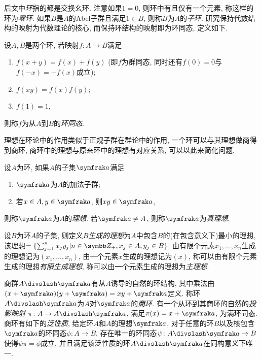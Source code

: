 后文中\emph{环}指的都是交换幺环. 注意如果$1=0$, 则环中有且仅有一个元素, 称这样的环为\emph{零环}\footnotemark . 如果$B$是$A$的Abel子群且满足$1\in B$, 则称$B$为$A$的\emph{子环}.
研究保持代数结构的映射为代数理论的核心, 而保持环结构的映射即为环同态, 定义如下.
\begin{definition}
  设$A, B$是两个环, 若映射$f\colon A\to B$满足
  \begin{enumerate}
    \item $f(x+y)=f(x)+f(y)$ (即$f$为群同态, 同时还有$f(0)=0$与$f(-x)=-f(x)$成立);
    \item $f(xy)=f(x)f(y)$;
    \item $f(1)=1$,
  \end{enumerate}
  则称$f$为从$A$到$B$的\emph{环同态}.
\end{definition}

理想在环论中的作用类似于正规子群在群论中的作用, 一个环可以与其理想做商得到商环, 商环中的理想与原来环中的理想有对应关系, 可以以此来简化问题.
\begin{definition}
  设$A$为环, 如果$A$的子集$\ideal{a}$满足
  \begin{enumerate}
    \item $\ideal{a}$为$A$的加法子群;
    \item 若$x\in A, y\in\ideal{a}$, 则$xy\in\ideal{a}$,
  \end{enumerate}
  则称$\ideal{a}$为$A$的\emph{理想}. 若$\ideal{a}\neq A$, 则称$\ideal{a}$为\emph{真理想}\footnotemark .
\end{definition}

设$B$为环$A$的子集, 则定义$B$\emph{生成的理想}为$A$中包含$B$的(在包含意义下)最小的理想, 该理想$=\{\sum_{j=1}^n x_jy_j\vert n\in\ZZ_+, x_j\in A, y_j\in B\}$. 由有限个元素$x_1, \dotsc, x_n$生成的理想记为$(x_1, \dotsc, x_n)$, 由一个元素$x$生成的理想记为$(x)$, 称可以由有限个元素生成的理想\emph{有限生成理想}, 称可以由一个元素生成的理想为\emph{主理想}.

商群$A{\divslash} \ideal{a}$有从$A$诱导的自然的环结构, 其中乘法由$(x+\ideal{a})(y+\ideal{a})=xy+\ideal{a}$定义. 称环$A{\divslash}\ideal{a}$为$A$对$\ideal{a}$的\emph{商环}. 有一个从环到其商环的自然的\emph{投影映射} $\pi\colon A\to A{\divslash}\ideal{a}$, 满足$\pi(x)=x+\ideal{a}$, 为满环同态. 商环有如下的\emph{泛性质}, 给定环$A$和$A$的理想$\ideal{a}$, 对于任意的环$B$以及核包含$\ideal{a}$的环同态$\phi\colon A\to B$, 存在唯一的环同态$\psi\colon A{\divslash}\ideal{a}\to B$使得$\psi\pi=\phi$成立, 并且满足该泛性质的环$A{\divslash}\ideal{a}$在同构意义下唯一.

